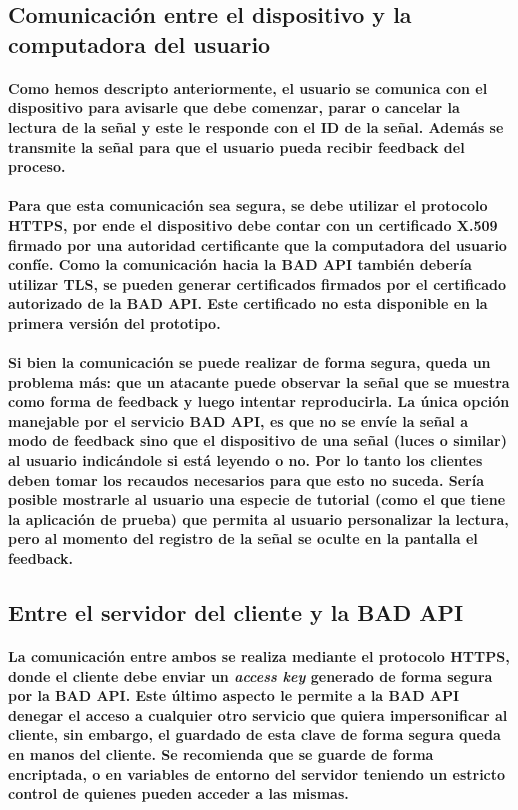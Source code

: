 \documentclass{article}
\begin{document}
\subsection{Comunicación entre el dispositivo y la computadora del usuario}
\paragraph{
Como hemos descripto anteriormente, el usuario se comunica con el dispositivo para avisarle que debe comenzar, parar o cancelar la lectura de la señal y este le responde con el ID de la señal. Además se transmite la señal para que el usuario pueda recibir feedback del proceso.
}
\paragraph{
Para que esta comunicación sea segura, se debe utilizar el protocolo HTTPS, por ende el dispositivo debe contar con un certificado X.509 firmado por una autoridad certificante que la computadora del usuario confíe. Como la comunicación hacia la BAD API también debería utilizar TLS, se pueden generar certificados firmados por el certificado autorizado de la BAD API. Este certificado no esta disponible en la primera versión del prototipo.
}
\paragraph{
Si bien la comunicación se puede realizar de forma segura, queda un problema más: que un atacante puede observar la señal que se muestra como forma de feedback y luego intentar reproducirla. La única opción manejable por el servicio BAD API, es que no se envíe la señal a modo de feedback sino que el dispositivo de una señal (luces o similar) al usuario indicándole si está leyendo o no. Por lo tanto los clientes deben tomar los recaudos necesarios para que esto no suceda. Sería posible mostrarle al usuario una especie de tutorial (como el que tiene la aplicación de prueba) que permita al usuario personalizar la lectura, pero al momento del registro de la señal se oculte en la pantalla el feedback.
}
\subsection{Entre el servidor del cliente y la BAD API}
\paragraph{
La comunicación entre ambos se realiza mediante el protocolo HTTPS, donde el cliente debe enviar un \textit{access key} generado de forma segura por la BAD API. Este último aspecto le permite a la BAD API denegar el acceso a cualquier otro servicio que quiera impersonificar al cliente, sin embargo, el guardado de esta clave de forma segura queda en manos del cliente. Se recomienda que se guarde de forma encriptada, o en variables de entorno del servidor teniendo un estricto control de quienes pueden acceder a las mismas.
}
\end{document}
